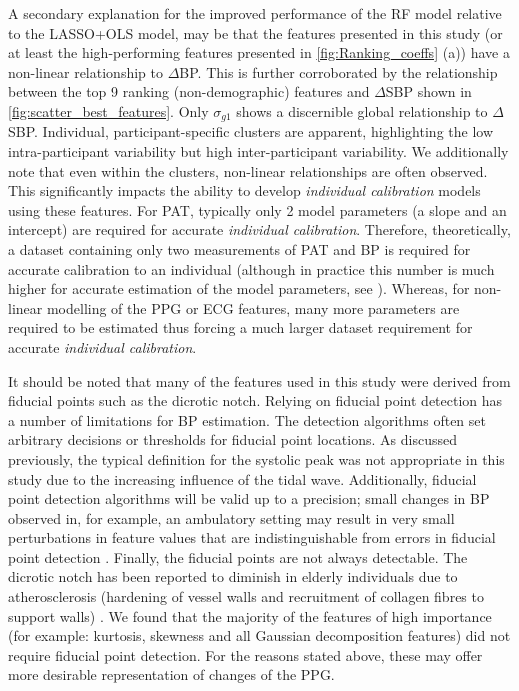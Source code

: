 \documentclass[fleqn,10pt]{wlscirep}
\begin{document}
A secondary explanation for the improved performance of the RF model relative to the LASSO+OLS model, may be that the features presented in this study (or at least the high-performing features presented in \cref{fig:Ranking_coeffs} (a)) have a non-linear relationship to $\Delta$BP. This is further corroborated by the relationship between the top 9 ranking (non-demographic) features and $\Delta$SBP shown in \cref{fig:scatter_best_features}. Only $\sigma_{g1}$ shows a discernible global relationship to $\Delta$SBP. Individual, participant-specific clusters are apparent, highlighting the low intra-participant variability but high inter-participant variability. We additionally note that even within the clusters, non-linear relationships are often observed. This significantly impacts the ability to develop \textit{individual calibration} models using these features. For PAT, typically only 2 model parameters (a slope and an intercept) are required for accurate \textit{individual calibration}. Therefore, theoretically, a dataset containing only two measurements of PAT and BP is required for accurate calibration to an individual (although in practice this number is much higher for accurate estimation of the model parameters, see \cite{Finnegan2021}). Whereas, for non-linear modelling of the PPG or ECG features, many more parameters are required to be estimated thus forcing a much larger dataset requirement for accurate \textit{individual calibration}. 


It should be noted that many of the features used in this study were derived from fiducial points such as the dicrotic notch. Relying on fiducial point detection has a number of limitations for BP estimation. The detection algorithms often set arbitrary decisions or thresholds for fiducial point locations. As discussed previously, the typical definition for the systolic peak was not appropriate in this study due to the increasing influence of the tidal wave. Additionally, fiducial point detection algorithms will be valid up to a precision; small changes in BP observed in, for example, an ambulatory setting may result in very small perturbations in feature values that are indistinguishable from errors in fiducial point detection \cite{Hasanzadeh2019}. Finally, the fiducial points are not always detectable. The dicrotic notch has been reported to diminish in elderly individuals due to atherosclerosis (hardening of vessel walls and recruitment of collagen fibres to support walls) \cite{Millasseau2006, Takazawa1998}. We found that the majority of the features of high importance (for example: kurtosis, skewness and all Gaussian decomposition features) did not require fiducial point detection. For the reasons stated above, these may offer more desirable representation of changes of the PPG. 
\end{document}
